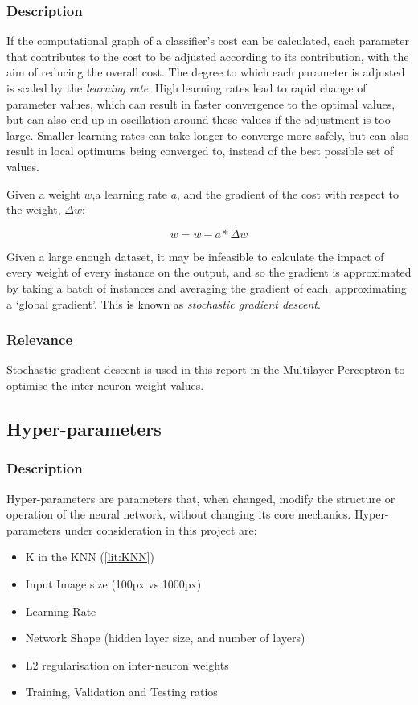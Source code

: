 \subsubsection{Description}
If the computational graph of a classifier's cost can be calculated, each parameter that contributes to the cost to be adjusted according to its contribution, with the aim of reducing the overall cost. The degree to which each parameter is adjusted is scaled by the \textit{learning rate}. High learning rates lead to rapid change of parameter values, which can result in faster convergence to the optimal values, but can also end up in oscillation around these values if the adjustment is too large. Smaller learning rates can take longer to converge more safely, but can also result in local optimums being converged to, instead of the best possible set of values.

Given a weight $w$,a learning rate $a$, and the gradient of the cost with respect to the weight, $\Delta w$:

\[w = w - a*\Delta w\]

Given a large enough dataset, it may be infeasible to calculate the impact of every weight of every instance on the output, and so the gradient is approximated by taking a batch of instances and averaging the gradient of each, approximating a `global gradient'. This is known as \textit{stochastic gradient descent}\cite{bottou2010large}.

\subsubsection{Relevance}
Stochastic gradient descent is used in this report in the Multilayer Perceptron to optimise the inter-neuron weight values. 

\subsection{Hyper-parameters}
\subsubsection{Description}
Hyper-parameters are parameters that, when changed, modify the structure or operation of the neural network, without changing its core mechanics. Hyper-parameters under consideration in this project are:
\begin{itemize}
	\item K in the KNN (\ref{lit:KNN})
	\item Input Image size (100px vs 1000px)
	\item Learning Rate
	\item Network Shape (hidden layer size, and number of layers)
	\item L2 regularisation on inter-neuron weights
	\item Training, Validation and Testing ratios
\end{itemize}
